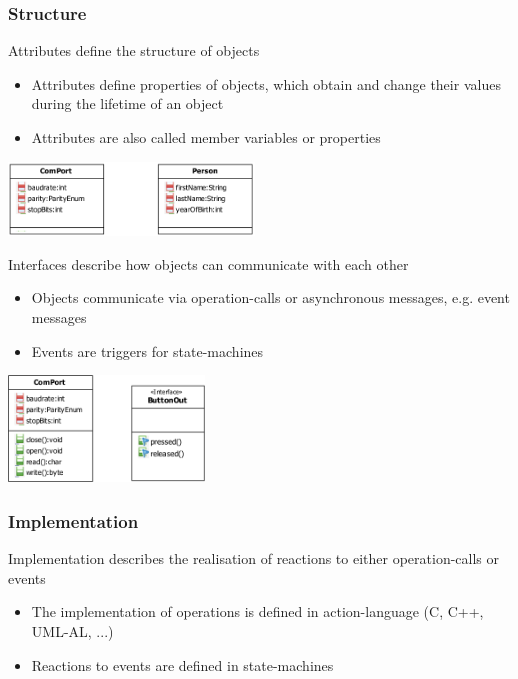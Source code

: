 \subsubsection{Structure}
\begin{paracol}{2}
    Attributes define the structure of objects
    \begin{itemize}
        \item Attributes define properties of objects, which obtain and change their values during the lifetime of an object
        \item Attributes are also called member variables or properties
    \end{itemize}
    \includegraphics[width=0.49\textwidth]{images/UML/class_attributes.png}

    \switchcolumn

    Interfaces describe how objects can communicate with each other
    \begin{itemize}
        \item Objects communicate via operation-calls or asynchronous messages, e.g. event messages
        \item Events are triggers for state-machines
    \end{itemize}
    \includegraphics[width=0.39\textwidth]{images/UML/class_interfaces.png}
\end{paracol}

\subsubsection{Implementation}
Implementation describes the realisation of reactions to either operation-calls or events
\begin{itemize}
    \item The implementation of operations is defined in action-language (C, C++, UML-AL, ...)
    \item Reactions to events are defined in state-machines
\end{itemize}

